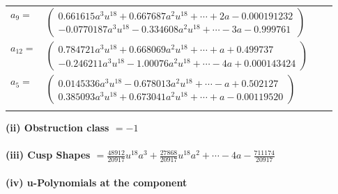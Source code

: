 \documentclass[1p]{elsarticle_modified}
\theoremstyle{definition}
\begin{document}
\begin{tabular}{m{7pt} m{180pt} m{7pt} m{180pt} }
\flushright $a_{9}=$&$\begin{pmatrix}0.661615 a^{3} u^{18}+0.667687 a^{2} u^{18}+\cdots+2 a-0.000191232\\-0.0770187 a^{3} u^{18}-0.334608 a^{2} u^{18}+\cdots-3 a-0.999761\end{pmatrix}$ \\
\flushright $a_{12}=$&$\begin{pmatrix}0.784721 a^{3} u^{18}+0.668069 a^{2} u^{18}+\cdots+a+0.499737\\-0.246211 a^{3} u^{18}-1.00076 a^{2} u^{18}+\cdots-4 a+0.000143424\end{pmatrix}$ \\
\flushright $a_{5}=$&$\begin{pmatrix}0.0145336 a^{3} u^{18}-0.678013 a^{2} u^{18}+\cdots-a+0.502127\\0.385093 a^{3} u^{18}+0.673041 a^{2} u^{18}+\cdots+a-0.00119520\end{pmatrix}$\\&\end{tabular}
\flushleft \textbf{(ii) Obstruction class $= -1$}\\~\\
\flushleft \textbf{(iii) Cusp Shapes $= \frac{48912}{20917} u^{18} a^3+\frac{27868}{20917} u^{18} a^2+\cdots-4 a-\frac{711174}{20917}$}\\~\\
\newpage\renewcommand{\arraystretch}{1}
\flushleft \textbf{(iv) u-Polynomials at the component}\newline \\
\end{document}
